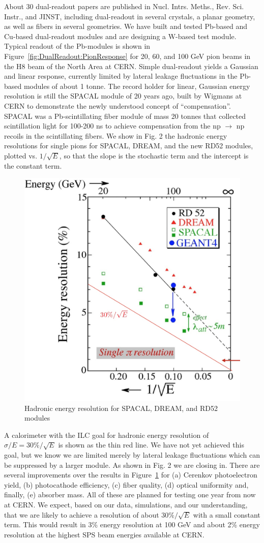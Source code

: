 About 30 dual-readout papers are published in Nucl. Intrs. Meths., Rev. Sci. Instr., and JINST, including dual-readout in several crystals, a planar geometry, as well as fibers in several geometries.
We have built and tested Pb-based and Cu-based dual-readout modules and are designing a W-based test module. Typical readout of the Pb-modules is shown in Figure~\ref{fig:DualReadout:PionResponse} for 20, 60, and 100 GeV pion beams in the H8 beam of the North Area at CERN.
Simple dual-readout yields a Gaussian and linear response, currently limited by lateral leakage fluctuations in the Pb-based modules of about 1 tonne.
The record holder for linear, Gaussian energy resolution is still the SPACAL module of 20 years ago, built by Wigmans at CERN to demonstrate the newly understood
concept of ``compensation''. SPACAL was a Pb-scintillating fiber module of mass
20 tonnes that collected scintillation light for 100-200 ns to achieve compensation
from the np $\to$ np recoils in the scintillating fibers. We show in Fig. 2 the hadronic
energy resolutions for single pions for SPACAL, DREAM, and the new RD52 modules, plotted vs. $1/\sqrt{E}$, so that the slope is the stochastic term and the intercept is the constant term.
\begin{figure}
\centering
\includegraphics[width=.5\linewidth]{Calorimeter/DualReadout/Res-pion-plot.jpg}
\caption{Hadronic energy resolution for SPACAL, DREAM, and RD52 modules}
\label{fig:DualReadout:PionResolution}
\end{figure}
A calorimeter with the ILC goal for hadronic energy resolution of
$\sigma/E = 30\%/\sqrt{E}$
is shown as the thin red line. We have not yet achieved this goal, but we know we are limited merely by lateral leakage fluctuations which can be suppressed by a larger module. As shown in Fig. 2 we are closing in.
There are several improvements over the results in Figure~\ref{fig:DualReadout:PionResolution} for (a) Cerenkov photoelectron yield, (b) photocathode efficiency, (c) fiber quality, (d) optical uniformity and, finally, (e) absorber mass. All of these are planned for testing one year from now at CERN. We expect,
based on our data, simulations, and our understanding, that we are likely to achieve a resolution of about $30\%/\sqrt{E}$ with a small constant term. This would result in 3\% energy resolution at 100 GeV and about 2\% energy resolution at the highest SPS beam energies available at CERN.
